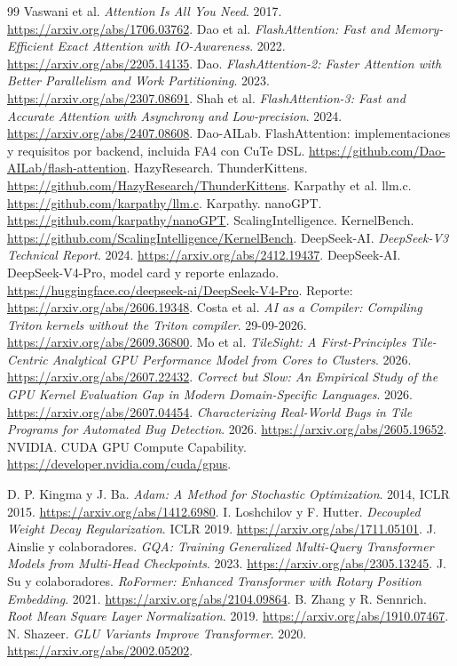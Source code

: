 \begin{thebibliography}{99}
 Vaswani et al. \emph{Attention Is All You Need}. 2017. \url{https://arxiv.org/abs/1706.03762}.
 Dao et al. \emph{FlashAttention: Fast and Memory-Efficient Exact Attention with IO-Awareness}. 2022. \url{https://arxiv.org/abs/2205.14135}.
 Dao. \emph{FlashAttention-2: Faster Attention with Better Parallelism and Work Partitioning}. 2023. \url{https://arxiv.org/abs/2307.08691}.
 Shah et al. \emph{FlashAttention-3: Fast and Accurate Attention with Asynchrony and Low-precision}. 2024. \url{https://arxiv.org/abs/2407.08608}.
 Dao-AILab. FlashAttention: implementaciones y requisitos por backend, incluida FA4 con CuTe DSL. \url{https://github.com/Dao-AILab/flash-attention}.
 HazyResearch. ThunderKittens. \url{https://github.com/HazyResearch/ThunderKittens}.
 Karpathy et al. llm.c. \url{https://github.com/karpathy/llm.c}.
 Karpathy. nanoGPT. \url{https://github.com/karpathy/nanoGPT}.
 ScalingIntelligence. KernelBench. \url{https://github.com/ScalingIntelligence/KernelBench}.
 DeepSeek-AI. \emph{DeepSeek-V3 Technical Report}. 2024. \url{https://arxiv.org/abs/2412.19437}.
 DeepSeek-AI. DeepSeek-V4-Pro, model card y reporte enlazado. \url{https://huggingface.co/deepseek-ai/DeepSeek-V4-Pro}. Reporte: \url{https://arxiv.org/abs/2606.19348}.
 Costa et al. \emph{AI as a Compiler: Compiling Triton kernels without the Triton compiler}. 29-09-2026. \url{https://arxiv.org/abs/2609.36800}.
 Mo et al. \emph{TileSight: A First-Principles Tile-Centric Analytical GPU Performance Model from Cores to Clusters}. 2026. \url{https://arxiv.org/abs/2607.22432}.
 \emph{Correct but Slow: An Empirical Study of the GPU Kernel Evaluation Gap in Modern Domain-Specific Languages}. 2026. \url{https://arxiv.org/abs/2607.04454}.
 \emph{Characterizing Real-World Bugs in Tile Programs for Automated Bug Detection}. 2026. \url{https://arxiv.org/abs/2605.19652}.
 NVIDIA. CUDA GPU Compute Capability. \url{https://developer.nvidia.com/cuda/gpus}.

 D. P. Kingma y J. Ba. \emph{Adam: A Method for Stochastic Optimization}. 2014, ICLR 2015. \url{https://arxiv.org/abs/1412.6980}.
 I. Loshchilov y F. Hutter. \emph{Decoupled Weight Decay Regularization}. ICLR 2019. \url{https://arxiv.org/abs/1711.05101}.
 J. Ainslie y colaboradores. \emph{GQA: Training Generalized Multi-Query Transformer Models from Multi-Head Checkpoints}. 2023. \url{https://arxiv.org/abs/2305.13245}.
 J. Su y colaboradores. \emph{RoFormer: Enhanced Transformer with Rotary Position Embedding}. 2021. \url{https://arxiv.org/abs/2104.09864}.
 B. Zhang y R. Sennrich. \emph{Root Mean Square Layer Normalization}. 2019. \url{https://arxiv.org/abs/1910.07467}.
 N. Shazeer. \emph{GLU Variants Improve Transformer}. 2020. \url{https://arxiv.org/abs/2002.05202}.



\end{thebibliography}
